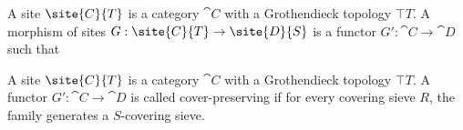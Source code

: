 \begin{definition}[Site]
A site $\site{C}{T}$ is a category $\cat{C}$ with a Grothendieck topology $\top{T}$.
A morphism of sites $G: \site{C}{T} \rightarrow \site{D}{S}$ 
is a functor $G':\cat{C} \rightarrow \cat{D}$ such that 
\end{definition}

\begin{definition}
A site $\site{C}{T}$ is a category $\cat{C}$ with a Grothendieck topology $\top{T}$.
A functor $G':\cat{C} \rightarrow \cat{D}$ is called cover-preserving if for every covering sieve $R$, the family
 generates a $S$-covering sieve.
\end{definition}

\begin{definition}

\end{definition}



